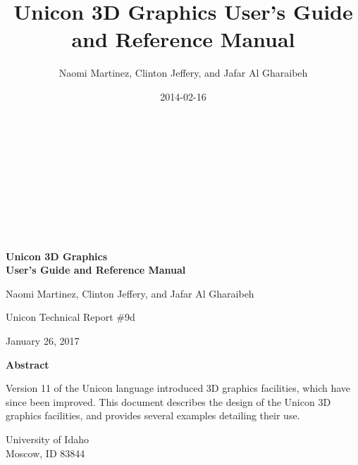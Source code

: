 \documentclass[letterpaper]{article}
\title{Unicon 3D Graphics User's Guide and Reference Manual}
\author{Naomi Martinez, Clinton Jeffery, and Jafar Al Gharaibeh}
\date{2014-02-16}
\begin{document}
\clearpage\setcounter{page}{1}\pagestyle{Nextconverti}
\thispagestyle{Standard}

\ \\
\ \\
\ \\
\ \\
\ \\
\ \\
\ \\

\begin{center}
{\Large\bfseries
Unicon 3D Graphics\\
User's Guide and Reference Manual
}
\end{center}

\bigskip

\bigskip

\bigskip

\bigskip

\bigskip

\bigskip

\bigskip


{\centering{}
Naomi Martinez, Clinton Jeffery, and Jafar Al Gharaibeh
\par}

{\centering{}
Unicon Technical Report \#9d
\par}

{\centering{}
January 26, 2017
\par}

\bigskip

\bigskip

\bigskip

\bigskip

\bigskip

{\centering\bfseries
Abstract
\par}


\bigskip

Version 11 of the Unicon language introduced 3D graphics facilities,
which have since been improved.  This document describes the design of
the Unicon 3D graphics facilities, and provides several examples
detailing their use.


\bigskip


\bigskip


\bigskip


\bigskip


\bigskip

{\centering
University of Idaho\\
Moscow, ID 83844
\par}
\end{document}
